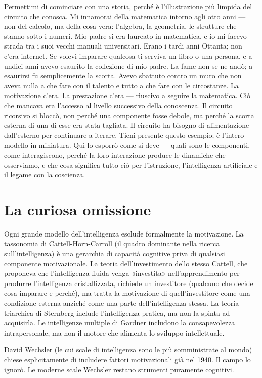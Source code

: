 \documentclass[11pt, twoside, openright]{book}
\begin{document}
Permettimi di cominciare con una storia, perché è l'illustrazione più limpida del circuito che conosca. Mi innamorai della matematica intorno agli otto anni --- non del calcolo, ma della cosa vera: l'algebra, la geometria, le strutture che stanno sotto i numeri. Mio padre si era laureato in matematica, e io mi facevo strada tra i suoi vecchi manuali universitari. Erano i tardi anni Ottanta; non c'era internet. Se volevi imparare qualcosa ti serviva un libro o una persona, e a undici anni avevo esaurito la collezione di mio padre. La fame non se ne andò; a esaurirsi fu semplicemente la scorta. Avevo sbattuto contro un muro che non aveva nulla a che fare con il talento e tutto a che fare con le circostanze. La motivazione c'era. La prestazione c'era --- riuscivo a seguire la matematica. Ciò che mancava era l'accesso al livello successivo della conoscenza. Il circuito ricorsivo si bloccò, non perché una componente fosse debole, ma perché la scorta esterna di una di esse era stata tagliata. Il circuito ha bisogno di alimentazione dall'esterno per continuare a iterare. Tieni presente questo esempio; è l'intero modello in miniatura. Qui lo esporrò come si deve --- quali sono le componenti, come interagiscono, perché la loro interazione produce le dinamiche che osserviamo, e che cosa significa tutto ciò per l'istruzione, l'intelligenza artificiale e il legame con la coscienza.

\section*{La curiosa omissione}

Ogni grande modello dell'intelligenza esclude formalmente la motivazione. La tassonomia di Cattell-Horn-Carroll (il quadro dominante nella ricerca sull'intelligenza) è una gerarchia di capacità cognitive priva di qualsiasi componente motivazionale. La teoria dell'investimento dello stesso Cattell, che proponeva che l'intelligenza fluida venga «investita» nell'apprendimento per produrre l'intelligenza cristallizzata, richiede un investitore (qualcuno che decide cosa imparare e perché), ma tratta la motivazione di quell'investitore come una condizione esterna anziché come una parte dell'intelligenza stessa. La teoria triarchica di Sternberg include l'intelligenza pratica, ma non la spinta ad acquisirla. Le intelligenze multiple di Gardner includono la consapevolezza intrapersonale, ma non il motore che alimenta lo sviluppo intellettuale.

David Wechsler (le cui scale di intelligenza sono le più somministrate al mondo) chiese esplicitamente di includere fattori motivazionali già nel 1940. Il campo lo ignorò. Le moderne scale Wechsler restano strumenti puramente cognitivi.
\end{document}
